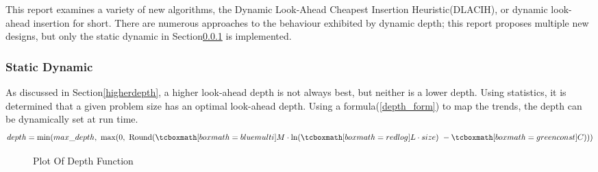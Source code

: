 This report examines a variety of new algorithms, the Dynamic Look-Ahead Cheapest Insertion Heuristic(DLACIH), or dynamic look-ahead insertion for short. There are numerous approaches to the behaviour exhibited by dynamic depth; this report proposes multiple new designs, but only the static dynamic in Section\ref{SDynamic} is implemented.

\subsubsection{Static Dynamic}
\label{SDynamic}

As discussed in Section\ref{higherdepth}, a higher look-ahead depth is not always best, but neither is a lower depth. Using statistics, it is determined that a given problem size has an optimal look-ahead depth. Using a formula(\ref{depth_form}) to map the trends, the depth can be dynamically set at run time.
\vspace{0.7cm}
\begin{equation}
    depth = \min(max\_depth,\  \max(0,\ \text{Round}(\tcboxmath[boxmath={blue}{multi}]{M}\cdot\ln(\tcboxmath[boxmath={red}{log}]{L\cdot size})\ - \tcboxmath[boxmath={green}{const}]{C})))
    \label{depth_form}
\end{equation}
\vspace{-0.7cm}

\begin{figure}[H]
    \centering
    \caption{Plot Of Depth Function}
\end{figure}

